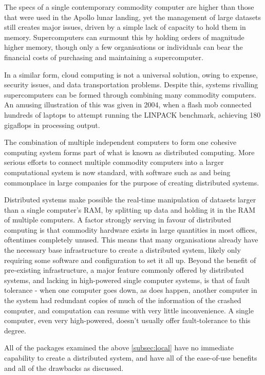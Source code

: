 
The specs of a single contemporary commodity computer are higher than those that were used in the Apollo lunar landing, yet the management of large datasets still creates major issues, driven by a simple lack of capacity to hold them in memory.
Supercomputers can surmount this by holding orders of magnitude higher memory, though only a few organisations or individuals can bear the financial costs of purchasing and maintaining a supercomputer.

In a similar form, cloud computing is not a universal solution, owing to expense, security issues, and data transportation problems.
Despite this, systems rivalling supercomputers can be formed through combining many commodity computers.
An amusing illustration of this was given in 2004, when a flash mob connected hundreds of laptops to attempt running the LINPACK benchmark, achieving 180 gigaflops in processing output\cite{perry2004flashcomp}.

The combination of multiple independent computers to form one cohesive computing system forms part of what is known as distributed computing.
More serious efforts to connect multiple commodity computers into a larger computational system is now standard, with software such as  and  being commonplace in large companies for the purpose of creating distributed systems.

Distributed systems make possible the real-time manipulation of datasets larger than a single computer's RAM, by splitting up data and holding it in the RAM of multiple computers.
A factor strongly serving in favour of distributed computing is that commodity hardware exists in large quantities in most offices, oftentimes completely unused.
This means that many organisations already have the necessary base infrastructure to create a distributed system, likely only requiring some software and configuration to set it all up.
Beyond the benefit of pre-existing infrastructure, a major feature commonly offered by distributed systems, and lacking in high-powered single computer systems, is that of fault tolerance - when one computer goes down, as does happen, another computer in the system had redundant copies of much of the information of the crashed computer, and computation can resume with very little inconvenience.
A single computer, even very high-powered, doesn't usually offer fault-tolerance to this degree.

All of the packages examined the above \cref{subsec:local} have no immediate capability to create a distributed system, and have all of the ease-of-use benefits and all of the drawbacks as discussed.


